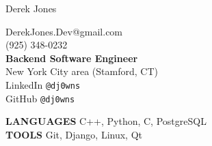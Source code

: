 \documentclass[10pt,oneside]{article}
\makeatletter
\newcommand{\name}{Derek Jones}
\newcommand{\cellphone}{(925) 348-0232}
\newcommand{\email}{DerekJones.Dev@gmail.com}
\newcommand{\github}{GitHub \texttt{@dj0wns}}
\newcommand{\linkedin}{LinkedIn \texttt{@dj0wns}}
\newcommand{\languages}{C++, Python, C, PostgreSQL}
\newcommand{\tools}{Git, Django, Linux, Qt}
\newcommand{\bigname}[1]{
  \begin{center}\huge#1\end{center}
}
\makeatother
\begin{document}
 \selectfont

\bigname{\name}
\vspace{-5pt}
\begin{flushleft}
 \begin{multicols}{3}
  \email \\
  \cellphone \\
  \centering \textbf{Backend Software Engineer} \\
  \centering New York City area (Stamford, CT) \\
  \hfill\linkedin \\
  \hfill\github \\
 \end{multicols}
\end{flushleft}

\begin{center}
 \begin{multicols}{2}
  \textbf{\uppercase{Languages}} \languages \\
  \textbf{\uppercase{Tools}} \tools \\
 \end{multicols}
\end{center}

\vspace{-5 pt}
\end{document}
